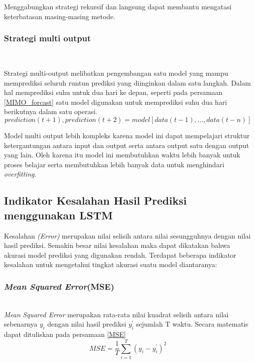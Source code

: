 \documentclass[../thesis.tex]{subfiles}
\begin{document}
Menggabungkan strategi rekursif dan langsung dapat membantu mengatasi keterbatasan masing-masing metode.

\subsubsection{Strategi multi output} \hfill\

Strategi multi-output melibatkan pengembangan satu model yang mampu memprediksi seluruh runtun prediksi yang diinginkan dalam satu langkah.
Dalam hal memprediksi suhu untuk dua hari ke depan, seperti pada persamaan \ref{MIMO_forcast} satu model digunakan untuk memprediksi suhu dua hari berikutnya dalam satu operasi.
\begin{equation} \label{MIMO_forcast}
		prediction(t+1), prediction(t+2) = model[data(t-1), ..., data(t-n)]
\end{equation}

Model multi output lebih kompleks karena model ini dapat mempelajari struktur ketergantungan antara input dan output serta antara output satu dengan output yang lain.
Oleh karena itu model ini membutuhkan waktu lebih banyak untuk proses belajar serta membutuhkan lebih banyak data untuk menghindari \textit{overfitting}.

\subsection{Indikator Kesalahan Hasil Prediksi menggunakan LSTM}
Kesalahan \textit{(Error)} merupakan nilai selisih antara nilai sesungguhnya dengan nilai hasil prediksi. Semakin besar nilai kesalahan maka dapat dikatakan bahwa akurasi model prediksi 
yang digunakan rendah. Terdapat beberapa indikator kesalahan untuk mengetahui tingkat akurasi suatu model diantaranya:

\subsubsection{\textit{Mean Squared Error}(MSE)} \hfill\\

\textit{Mean Squared Error} merupakan rata-rata nilai kuadrat selisih antara nilai sebenarnya $y_i$ dengan nilai hasil prediksi $y^{'}_i$ sejumlah T waktu. Secara matematis dapat dituliskan pada persamaan \ref{MSE}
\begin{equation}\label{MSE}
	MSE = \frac {1}{T}\sum \limits_{i=1}^{T} {(y_i - y^{'}_i)^2}
\end{equation}
\end{document}
